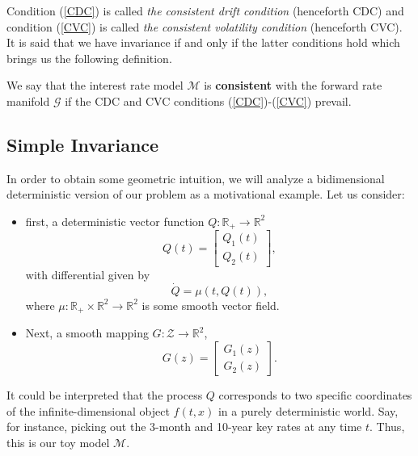 Condition (\ref{CDC}) is called {\sl the consistent drift condition}
(henceforth CDC) and condition (\ref{CVC}) is called {\sl the
  consistent volatility condition} (henceforth CVC). It is said that
we have invariance if and only if the latter conditions hold which
brings us the following definition. 
\begin{defn}[Consistency.] We say that the interest rate model
  $\mathcal{M}$ is {\bf consistent} with the forward rate manifold
  $\mathcal{G}$ if the CDC and CVC conditions (\ref{CDC})-(\ref{CVC})
  prevail.
\end{defn}
\subsection{Simple Invariance}
In order to obtain some geometric intuition, we will analyze a
bidimensional deterministic version of our problem as a motivational
example. Let us consider:
\begin{itemize}
\item first, a deterministic vector function $Q :\mathbb{R}_+
  \rightarrow \mathbb{R}^2$ 
\begin{equation}
Q(t)=\left[\begin{matrix}
Q_1(t)\\
Q_2(t)
\end{matrix}\right],
\end{equation}
with differential given by
\begin{equation}
\label{LinearDynSystem}
\dot{Q} = \mu(t,Q(t)),
\end{equation}
where $\mu: \mathbb{R}_+ \times \mathbb{R}^2 \rightarrow \mathbb{R}^2$
is some smooth vector field.
\item Next, a smooth mapping $G : \mathcal{Z} \rightarrow \mathbb{R}^2$,
\begin{equation}
G(z)=\left[\begin{matrix}
G_1(z)\\
G_2(z)
\end{matrix}\right].
\end{equation}
\end{itemize}
It could be interpreted that the process $Q$ corresponds to two
specific coordinates of the infinite-dimensional object $f(t,x)$ in a
purely deterministic world. Say, for instance, picking out the 3-month
and 10-year key rates at any time $t$. Thus, this is our toy model
$\mathcal{M}$. 

